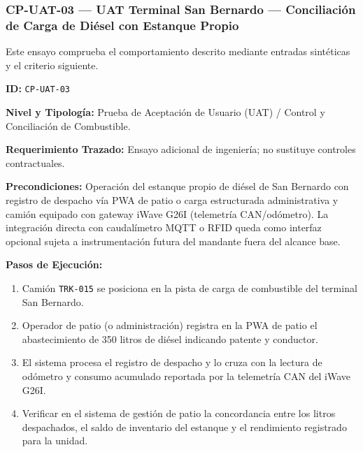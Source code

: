 \subsubsection*{CP-UAT-03 — UAT Terminal San Bernardo — Conciliación de Carga de Diésel con Estanque Propio}\label{sec:9-cp-uat-03}
Este ensayo comprueba el comportamiento descrito mediante entradas sintéticas y el criterio siguiente.

\par\noindent\textbf{ID:} \texttt{C\allowbreak{}P\allowbreak{}-\allowbreak{}U\allowbreak{}A\allowbreak{}T\allowbreak{}-\allowbreak{}0\allowbreak{}3\allowbreak{}}\par
\par\noindent\textbf{Nivel y Tipología:} Prueba de Aceptación de Usuario (UAT) / Control y Conciliación de Combustible.\par
\par\noindent\textbf{Requerimiento Trazado:} Ensayo adicional de ingeniería; no sustituye controles contractuales.\par
\par\noindent\textbf{Precondiciones:} Operación del estanque propio de diésel de San Bernardo con registro de despacho vía PWA de patio o carga estructurada administrativa y camión equipado con gateway iWave G26I (telemetría CAN/odómetro). La integración directa con caudalímetro MQTT o RFID queda como interfaz opcional sujeta a instrumentación futura del mandante fuera del alcance base.\par
\par\noindent\textbf{Pasos de Ejecución:} \par
\begin{enumerate}
\item Camión \texttt{T\allowbreak{}R\allowbreak{}K\allowbreak{}-\allowbreak{}0\allowbreak{}1\allowbreak{}5\allowbreak{}} se posiciona en la pista de carga de combustible del terminal San Bernardo.
\item Operador de patio (o administración) registra en la PWA de patio el abastecimiento de 350 litros de diésel indicando patente y conductor.
\item El sistema procesa el registro de despacho y lo cruza con la lectura de odómetro y consumo acumulado reportada por la telemetría CAN del iWave G26I.
\item Verificar en el sistema de gestión de patio la concordancia entre los litros despachados, el saldo de inventario del estanque y el rendimiento registrado para la unidad.
\end{enumerate}
